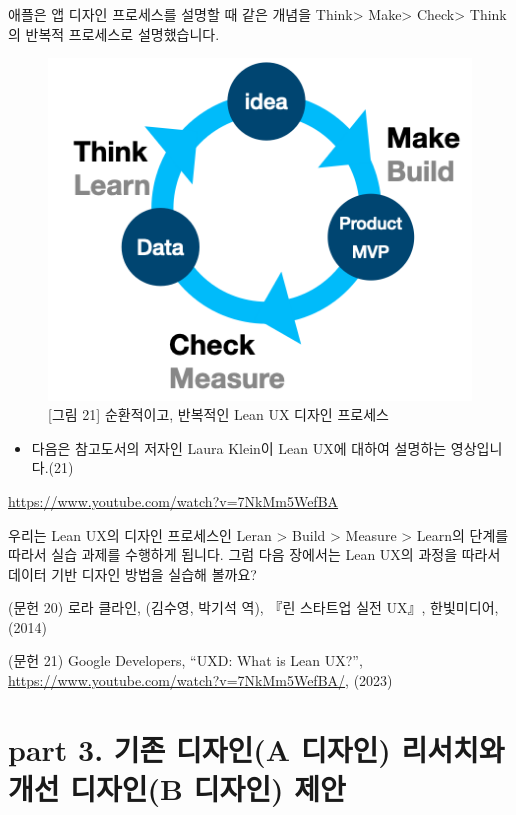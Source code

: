 \documentclass[
  letterpaper,
]{book}
\providecommand{\tightlist}{%
  \setlength{\itemsep}{0pt}\setlength{\parskip}{0pt}}\usepackage{longtable,booktabs,array}
\begin{document}
애플은 앱 디자인 프로세스를 설명할 때 같은 개념을 Think\textgreater{}
Make\textgreater{} Check\textgreater{} Think의 반복적 프로세스로
설명했습니다.

\begin{figure}[H]

{\centering \includegraphics{img/fig21.png}

}

\caption{{[}그림 21{]} 순환적이고, 반복적인 Lean UX 디자인 프로세스}

\end{figure}%

\begin{itemize}
\tightlist
\item
  다음은 참고도서의 저자인 Laura Klein이 Lean UX에 대하여 설명하는
  영상입니다.(21)
\end{itemize}

\url{https://www.youtube.com/watch?v=7NkMm5WefBA}

우리는 Lean UX의 디자인 프로세스인 Leran \textgreater{} Build
\textgreater{} Measure \textgreater{} Learn의 단계를 따라서 실습 과제를
수행하게 됩니다. 그럼 다음 장에서는 Lean UX의 과정을 따라서 데이터 기반
디자인 방법을 실습해 볼까요?

(문헌 20) 로라 클라인, (김수영, 박기석 역), 『린 스타트업 실전 UX』,
한빛미디어,(2014)

(문헌 21) Google Developers, ``UXD: What is Lean UX?'',
\url{https://www.youtube.com/watch?v=7NkMm5WefBA/}, (2023)

\part{\textbf{part 3. 기존 디자인(A 디자인) 리서치와 개선 디자인(B
디자인) 제안}}
\end{document}
